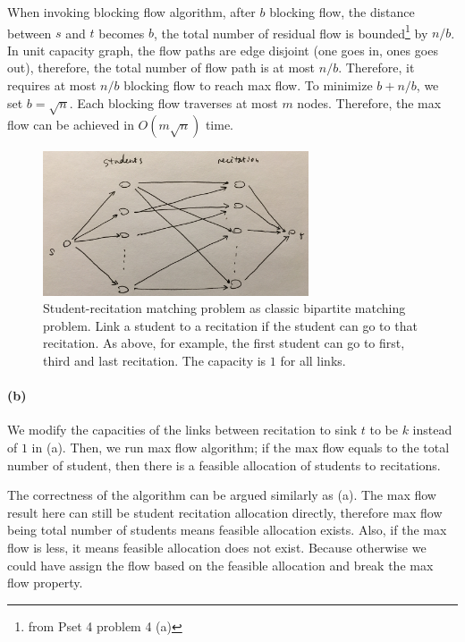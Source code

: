 \documentclass[12pt]{article}
\begin{document}
When invoking blocking flow algorithm, after $b$ blocking flow, the distance between $s$ and $t$ becomes $b$, the total number of residual flow is bounded\footnote{from Pset 4 problem 4 (a)} by $n/b$. In unit capacity graph, the flow paths are edge disjoint (one goes in, ones goes out), therefore, the total number of flow path is at most $n/b$. Therefore, it requires at most $n/b$ blocking flow to reach max flow. To minimize $b + n/b$, we set $b=\sqrt{n}$. Each blocking flow traverses at most $m$ nodes. Therefore, the max flow can be achieved in $O(m\sqrt{n})$ time.
\begin{figure}[h!]
	\centering
	\includegraphics[width=0.7\textwidth]{3-a.jpg}
	\caption{Student-recitation matching problem as classic bipartite matching problem. Link a student to a recitation if the student can go to that recitation. As above, for example, the first student can go to first, third and last recitation. The capacity is $1$ for all links.}
	\label{fig:3-a}
\end{figure}
\paragraph{(b)} We modify the capacities of the links between recitation to sink $t$ to be $k$ instead of $1$ in (a). Then, we run max flow algorithm; if the max flow equals to the total number of student, then there is a feasible allocation of students to recitations. 

The correctness of the algorithm can be argued similarly as (a). The max flow result here can still be student recitation allocation directly, therefore max flow being total number of students means feasible allocation exists. Also, if the max flow is less, it means feasible allocation does not exist. Because otherwise we could have assign the flow based on the feasible allocation and break the max flow property. 
\end{document}
